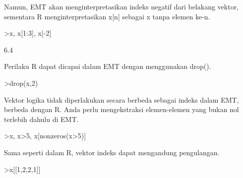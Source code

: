 \documentclass[12pt,arial,letterpaper]{book}
\begin{document}
\begin{eulercomment}
\begin{eulercomment}
\begin{eulercomment}
\begin{eulercomment}
\begin{eulercomment}
\begin{eulercomment}
\begin{eulercomment}
\begin{eulercomment}
\begin{eulercomment}
\begin{eulercomment}
\begin{eulercomment}
\begin{eulercomment}
\begin{eulercomment}
\begin{eulercomment}
\begin{eulercomment}
\begin{eulercomment}
\begin{eulercomment}
\begin{eulercomment}
\begin{eulercomment}
\begin{eulercomment}
\begin{eulercomment}
\begin{eulercomment}
\begin{eulercomment}
\begin{eulercomment}
\begin{eulercomment}
\begin{eulercomment}
\begin{eulercomment}
\begin{eulercomment}
\begin{eulercomment}
\begin{eulercomment}
\begin{eulercomment}
\begin{eulercomment}
\begin{eulercomment}
\begin{eulercomment}
\begin{eulercomment}
\begin{eulercomment}
\begin{eulercomment}
Namun, EMT akan menginterpretasikan indeks negatif dari belakang
vektor, sementara R menginterpretasikan x[n] sebagai x tanpa elemen
ke-n.
\end{eulercomment}
\begin{eulerprompt}
>x, x[1:3], x[-2]
\end{eulerprompt}
\begin{euleroutput}
  [10.4,  5.6,  3.1,  6.4,  21.7]
  [10.4,  5.6,  3.1]
  6.4
\end{euleroutput}
\begin{eulercomment}
Perilaku R dapat dicapai dalam EMT dengan menggunakan drop().
\end{eulercomment}
\begin{eulerprompt}
>drop(x,2)
\end{eulerprompt}
\begin{euleroutput}
  [10.4,  3.1,  6.4,  21.7]
\end{euleroutput}
\begin{eulercomment}
Vektor logika tidak diperlakukan secara berbeda sebagai indeks dalam
EMT, berbeda dengan R. Anda perlu mengekstraksi elemen-elemen yang
bukan nol terlebih dahulu di EMT.
\end{eulercomment}
\begin{eulerprompt}
>x, x>5, x[nonzeros(x>5)]
\end{eulerprompt}
\begin{euleroutput}
  [10.4,  5.6,  3.1,  6.4,  21.7]
  [1,  1,  0,  1,  1]
  [10.4,  5.6,  6.4,  21.7]
\end{euleroutput}
\begin{eulercomment}
Sama seperti dalam R, vektor indeks dapat mengandung pengulangan.
\end{eulercomment}
\begin{eulerprompt}
>x[[1,2,2,1]]
\end{eulerprompt}

\end{eulercomment}
\end{eulercomment}
\end{eulercomment}
\end{eulercomment}
\end{eulercomment}
\end{eulercomment}
\end{eulercomment}
\end{eulercomment}
\end{eulercomment}
\end{eulercomment}
\end{eulercomment}
\end{eulercomment}
\end{eulercomment}
\end{eulercomment}
\end{eulercomment}
\end{eulercomment}
\end{eulercomment}
\end{eulercomment}
\end{eulercomment}
\end{eulercomment}
\end{eulercomment}
\end{eulercomment}
\end{eulercomment}
\end{eulercomment}
\end{eulercomment}
\end{eulercomment}
\end{eulercomment}
\end{eulercomment}
\end{eulercomment}
\end{eulercomment}
\end{eulercomment}
\end{eulercomment}
\end{eulercomment}
\end{eulercomment}
\end{eulercomment}
\end{eulercomment}
\end{document}
